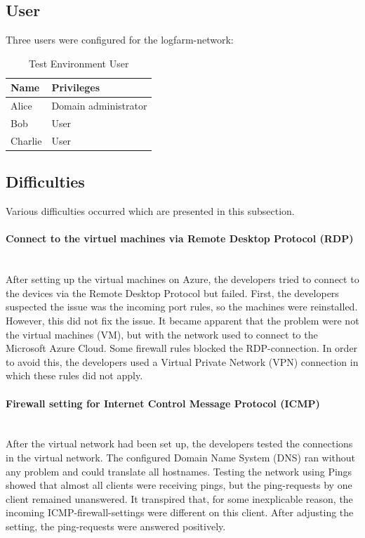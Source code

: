 \clearpage

\subsection{User}
Three users were configured for the logfarm-network:
\begin{table}[H]
    \centering
    \begin{tabular}{p{4cm} p{8cm}} \hline
        \textbf{Name} & \textbf{Privileges}  \\ \hline
        Alice & Domain administrator  \\ \hline
        Bob & User  \\ \hline
        Charlie & User  \\ \hline
    \end{tabular}
    \caption{Test Environment User}
\end{table}

\subsection{Difficulties}
Various difficulties occurred which are presented in this subsection.
\paragraph{Connect to the virtuel machines via Remote Desktop Protocol (RDP)} \ \\
After setting up the virtual machines on Azure, the developers tried to connect to the devices via the Remote Desktop Protocol but failed. First, the developers suspected the issue was the incoming port rules, so the machines were reinstalled. However, this did not fix the issue. It became apparent that the problem were not the virtual machines (VM), but with the network used to connect to the Microsoft Azure Cloud. Some firewall rules blocked the RDP-connection. In order to avoid this, the developers used a Virtual Private Network (VPN) connection in which these rules did not apply.
\paragraph{Firewall setting for Internet Control Message Protocol (ICMP)}\ \\
After the virtual network had been set up, the developers tested the connections in the virtual network. The configured Domain Name System (DNS) ran without any problem and could translate all hostnames. Testing the network using Pings showed that almost all clients were receiving pings, but the ping-requests by one client remained unanswered. It transpired that, for some inexplicable reason, the incoming ICMP-firewall-settings were different on this client. After adjusting the setting, the ping-requests were answered positively.


